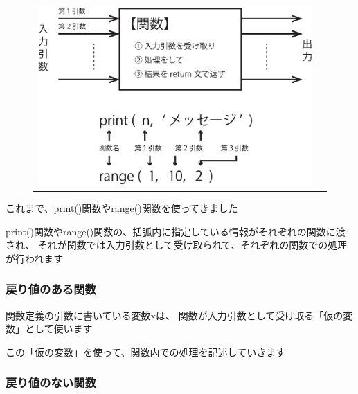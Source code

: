 \documentclass[uplatex,a4paper,11pt,oneside,openany]{jsbook}
\begin{document}
\begin{figure}[H]
  \centering
  \begin{tabular}{cc}
      \begin{minipage}{0.10\hsize}
      \centering
%
      \end{minipage}
      \begin{minipage}{0.9\hsize}
      \centering
\includegraphics[scale=0.5]{figures/eps/func.eps}
      \end{minipage}
    \end{tabular}
\end{figure}%

これまで、print()関数やrange()関数を使ってきました

print()関数やrange()関数の、括弧内に指定している情報がそれぞれの関数に渡され、
それが関数では入力引数として受け取られて、それぞれの関数での処理が行われます

\subsubsection{戻り値のある関数}



関数定義の引数に書いている変数xは、
関数が入力引数として受け取る「仮の変数」として使います

この「仮の変数」を使って、関数内での処理を記述していきます

\subsubsection{戻り値のない関数}
\end{document}
